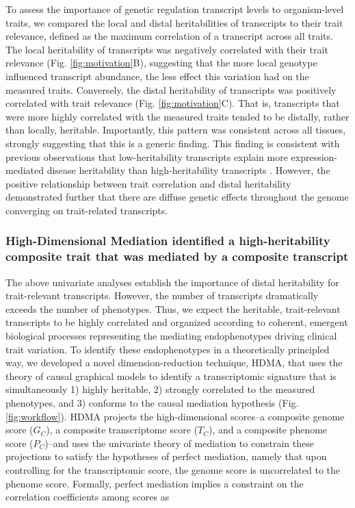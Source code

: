 \documentclass[
]{article}
\begin{document}
To assess the importance of genetic regulation transcript levels to
organism-level traits, we compared the local and distal heritabilities
of transcripts to their trait relevance, defined as the maximum
correlation of a transcript across all traits. The local heritability of
transcripts was negatively correlated with their trait relevance (Fig.
\ref{fig:motivation}B), suggesting that the more local genotype
influenced transcript abundance, the less effect this variation had on
the measured traits. Conversely, the distal heritability of transcripts
was positively correlated with trait relevance (Fig.
\ref{fig:motivation}C). That is, transcripts that were more highly
correlated with the measured traits tended to be distally, rather than
locally, heritable. Importantly, this pattern was consistent across all
tissues, strongly suggesting that this is a generic finding. This
finding is consistent with previous observations that low-heritability
transcripts explain more expression-mediated disease heritability than
high-heritability transcripts \cite{pmid32424349}. However, the positive
relationship between trait correlation and distal heritability
demonstrated further that there are diffuse genetic effects throughout
the genome converging on trait-related transcripts.

\subsubsection{High-Dimensional Mediation identified a high-heritability
composite trait that was mediated by a composite
transcript}\label{high-dimensional-mediation-identified-a-high-heritability-composite-trait-that-was-mediated-by-a-composite-transcript}

The above univariate analyses establish the importance of distal
heritability for trait-relevant transcripts. However, the number of
transcripts dramatically exceeds the number of phenotypes. Thus, we
expect the heritable, trait-relevant transcripts to be highly correlated
and organized according to coherent, emergent biological processes
representing the mediating endophenotypes driving clinical trait
variation. To identify these endophenotypes in a theoretically
principled way, we developed a novel dimension-reduction technique,
HDMA, that uses the theory of causal graphical models to identify a
transcriptomic signature that is simultaneously 1) highly heritable, 2)
strongly correlated to the measured phenotypes, and 3) conforms to the
causal mediation hypothesis (Fig. \ref{fig:workflow}). HDMA projects the
high-dimensional scores--a composite genome score (\(G_C\)), a composite
transcriptome score (\(T_C\)), and a composite phenome score
(\(P_C\))--and uses the univariate theory of mediation to constrain
these projections to satisfy the hypotheses of perfect mediation, namely
that upon controlling for the transcriptomic score, the genome score is
uncorrelated to the phenome score. Formally, perfect mediation implies a
constraint on the correlation coefficients among scores as
\end{document}
